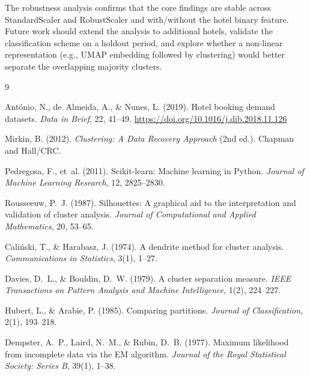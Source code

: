 \documentclass[12pt,a4paper]{article}
\begin{document}
The robustness analysis confirms that the core findings are stable across
StandardScaler and RobustScaler and with/without the hotel binary feature.
Future work should extend the analysis to additional hotels, validate the
classification scheme on a holdout period, and explore whether a
non-linear representation (e.g., UMAP embedding followed by clustering)
would better separate the overlapping majority clusters.



\begin{thebibliography}{9}

António, N., de~Almeida, A., \& Nunes, L. (2019).
Hotel booking demand datasets.
\textit{Data in Brief}, 22, 41--49.
\url{https://doi.org/10.1016/j.dib.2018.11.126}

Mirkin, B. (2012).
\textit{Clustering: A Data Recovery Approach} (2nd ed.).
Chapman and Hall/CRC.

Pedregosa, F., et~al. (2011).
Scikit-learn: Machine learning in Python.
\textit{Journal of Machine Learning Research}, 12, 2825--2830.

Rousseeuw, P.~J. (1987).
Silhouettes: A graphical aid to the interpretation and validation of cluster analysis.
\textit{Journal of Computational and Applied Mathematics}, 20, 53--65.

Cali\'nski, T., \& Harabasz, J. (1974).
A dendrite method for cluster analysis.
\textit{Communications in Statistics}, 3(1), 1--27.

Davies, D.~L., \& Bouldin, D.~W. (1979).
A cluster separation measure.
\textit{IEEE Transactions on Pattern Analysis and Machine Intelligence},
1(2), 224--227.

Hubert, L., \& Arabie, P. (1985).
Comparing partitions.
\textit{Journal of Classification}, 2(1), 193--218.

Dempster, A.~P., Laird, N.~M., \& Rubin, D.~B. (1977).
Maximum likelihood from incomplete data via the EM algorithm.
\textit{Journal of the Royal Statistical Society: Series B}, 39(1), 1--38.

\end{thebibliography}

\appendix
\end{document}
